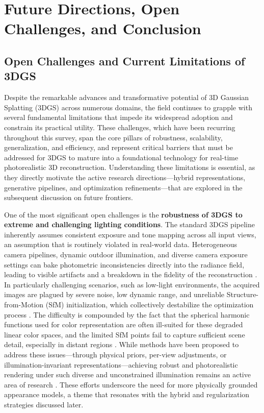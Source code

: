 \documentclass[11pt]{article}
\begin{document}
\section{Future Directions, Open Challenges, and Conclusion}

\subsection{Open Challenges and Current Limitations of 3DGS}

Despite the remarkable advances and transformative potential of 3D Gaussian Splatting (3DGS) across numerous domains, the field continues to grapple with several fundamental limitations that impede its widespread adoption and constrain its practical utility. These challenges, which have been recurring throughout this survey, span the core pillars of robustness, scalability, generalization, and efficiency, and represent critical barriers that must be addressed for 3DGS to mature into a foundational technology for real-time photorealistic 3D reconstruction. Understanding these limitations is essential, as they directly motivate the active research directions---hybrid representations, generative pipelines, and optimization refinements---that are explored in the subsequent discussion on future frontiers.

One of the most significant open challenges is the \textbf{robustness of 3DGS to extreme and challenging lighting conditions}. The standard 3DGS pipeline inherently assumes consistent exposure and tone mapping across all input views, an assumption that is routinely violated in real-world data. Heterogeneous camera pipelines, dynamic outdoor illumination, and diverse camera exposure settings can bake photometric inconsistencies directly into the radiance field, leading to visible artifacts and a breakdown in the fidelity of the reconstruction \cite{ref298}. In particularly challenging scenarios, such as low-light environments, the acquired images are plagued by severe noise, low dynamic range, and unreliable Structure-from-Motion (SfM) initialization, which collectively destabilize the optimization process \cite{ref760}. The difficulty is compounded by the fact that the spherical harmonic functions used for color representation are often ill-suited for these degraded linear color spaces, and the limited SfM points fail to capture sufficient scene detail, especially in distant regions \cite{ref761}. While methods have been proposed to address these issues---through physical priors, per-view adjustments, or illumination-invariant representations---achieving robust and photorealistic rendering under such diverse and unconstrained illumination remains an active area of research \cite{ref293,ref762}. These efforts underscore the need for more physically grounded appearance models, a theme that resonates with the hybrid and regularization strategies discussed later.
\end{document}
